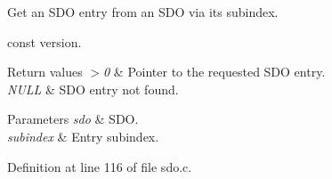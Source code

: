 \-Get an \-S\-D\-O entry from an \-S\-D\-O via its subindex. 

const version.


\begin{DoxyRetVals}{\-Return values}
{\em $>$0} & \-Pointer to the requested \-S\-D\-O entry. \\
\hline
{\em \-N\-U\-L\-L} & \-S\-D\-O entry not found. \\
\hline
\end{DoxyRetVals}

\begin{DoxyParams}{\-Parameters}
{\em sdo} & \-S\-D\-O. \\
\hline
{\em subindex} & \-Entry subindex. \\
\hline
\end{DoxyParams}


\-Definition at line 116 of file sdo.\-c.

